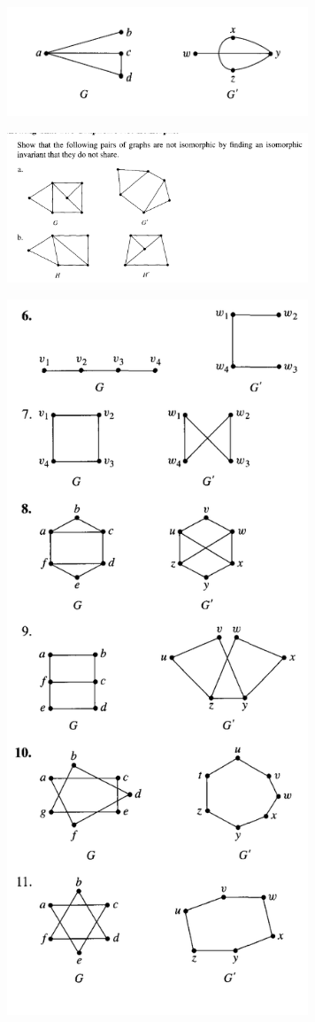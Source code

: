 \documentclass{article}
\begin{document}
\begin{figure}
\centering
\includegraphics[width=90mm]{5}
\end{figure}

\begin{figure}
\centering
\includegraphics[width=90mm]{7}
\end{figure}

\begin{figure}
\centering
\includegraphics[width=90mm]{8}
\end{figure}
\end{document}
